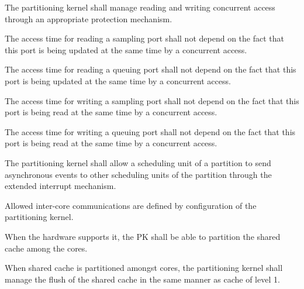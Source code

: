 The partitioning kernel shall manage reading and writing concurrent access through an appropriate protection mechanism.

The access time for reading a sampling port shall not depend on the fact that this port is being updated at the same time by a concurrent access.

The access time for reading a queuing port shall not depend on the fact that this port is being updated at the same time by a concurrent access.

The access time for writing a sampling port shall not depend on the fact that this port is being read at the same time by a concurrent access.

The access time for writing a queuing port shall not depend on the fact that this port is being read at the same time by a concurrent access.

The partitioning kernel shall allow a scheduling unit of a partition to send asynchronous events to other scheduling units of the partition through the extended interrupt mechanism.

Allowed inter-core communications are defined by configuration of the partitioning kernel.

When the hardware supports it, the PK shall be able to partition the shared cache among the cores.

When shared cache is partitioned amongst cores, the partitioning kernel shall manage the flush of the shared cache in the same manner as cache of level 1.
